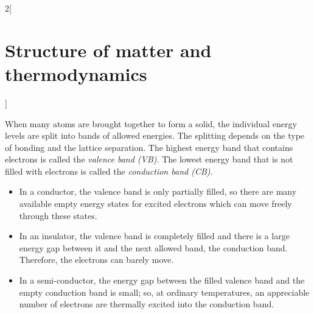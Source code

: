 \documentclass[../../../main.tex]{subfiles}
\begin{document}
\begin{multicols}{2}[\section{Structure of matter and thermodynamics}]
\begin{definition}
        \begin{center}
            \begin{minipage}{\linewidth}
                \centering
                
            \end{minipage}
        \end{center}
    \end{definition}
    \begin{prop}
        When many atoms are brought together to form a solid, the individual energy levels are split into bands of allowed energies. The splitting depends on the type of bonding and the lattice separation. The highest energy band that contains electrons is called the \textit{valence band (VB)}. The lowest energy band that is not filled with electrons is called the \textit{conduction band (CB)}.
        \begin{center}
            \begin{minipage}{\linewidth}
                \centering
                
            \end{minipage}
        \end{center}
        \begin{itemize}
            \item In a conductor, the valence band is only partially filled, so there are many available empty energy states for excited electrons which can move freely through these states.
            \item In an insulator, the valence band is completely filled and there is a large energy gap between it and the next allowed band, the conduction band. Therefore, the electrons can barely move.
            \item In a semi-conductor, the energy gap between the filled valence band and the empty conduction band is small; so, at ordinary temperatures, an appreciable number of electrons are thermally excited into the conduction band.
        \end{itemize}
    \end{prop}
\end{multicols}
\begin{center}
    \begin{minipage}{\linewidth}
        \centering
        
    \end{minipage}
\end{center}
\end{document}
